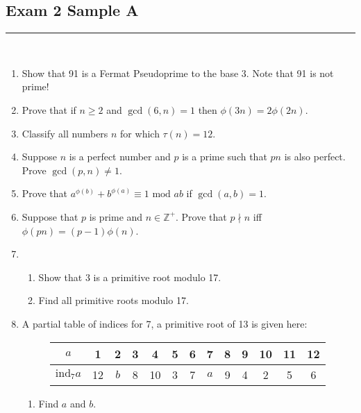 \documentclass[class=article, crop=false]{standalone}
\def\integers{{\mathbb Z}}
\def\ind{{\text{ind}}}
\begin{document}
\subsection*{Exam 2 Sample A}
\rule{\textwidth}{1pt}\\
\begin{enumerate}
	\item Show that 91 is a Fermat Pseudoprime to the base 3. Note that 91 is not prime!
	
	\item Prove that if $n\geq 2$ and $\gcd(6,n)=1$ then $\phi(3n)=2\phi(2n)$.
	
	\item Classify all numbers $n$ for which $\tau(n) = 12$.
	
	\item Suppose $n$ is a perfect number and $p$ is a prime such that $pn$ is also perfect.
	Prove $\gcd(p,n)\neq 1$.
	
	\item Prove that $a^{\phi(b)} + b^{\phi(a)} \equiv 1\mbox{ mod } ab$ if $\gcd(a,b)=1$.
	
	\item Suppose that $p$ is prime and $n\in\integers^+$. Prove that $p\nmid n$ iff $\phi(pn)=(p-1)\phi(n)$.
	
	\item 
	\begin{enumerate}
		\item Show that 3 is a primitive root modulo 17.
		
		\item Find all primitive roots modulo 17.
		
	\end{enumerate}

	\item A partial table of indices for 7, a primitive root of 13 is given here:
	\begin{figure}[h]
    \centering
    \begin{tabular}{|c|c|c|c|c|c|c|c|c|c|c|c|c|}
      \hline
      $a$ & 1 & 2 & 3 & 4 & 5 & 6 & 7 & 8 & 9 & 10 & 11 & 12 \\
      \hline
      $\ind_7 a$ & 12 & $b$ & 8 & 10 & 3 & 7 & $a$ & 9 & 4 & 2 & 5 & 6 \\
      \hline
    \end{tabular}
    \end{figure}
	\begin{enumerate}
		\item Find $a$ and $b$.
		

\end{enumerate}
\end{enumerate}
\end{document}
